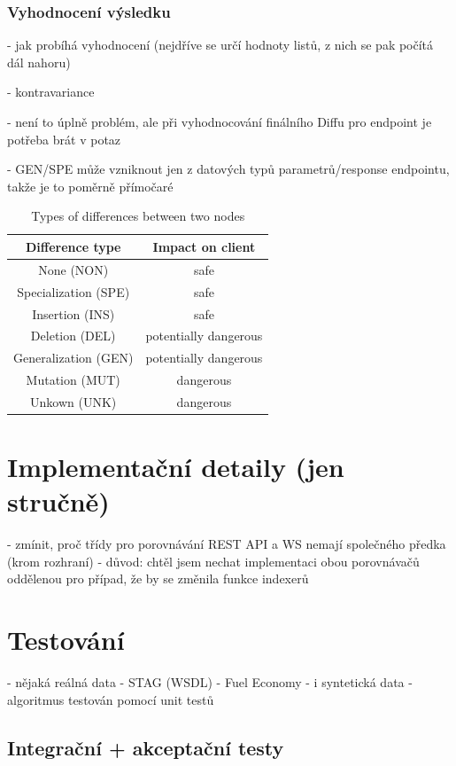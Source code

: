 \documentclass[czech,DP]{thesiskiv}
\begin{document}
\subsection{Vyhodnocení výsledku}

- jak probíhá vyhodnocení (nejdříve se určí hodnoty listů, z nich se pak počítá dál nahoru)

- kontravariance

	- není to úplně problém, ale při vyhodnocování finálního Diffu pro endpoint je potřeba brát v potaz 
	
	- GEN/SPE může vzniknout jen z datových typů parametrů/response endpointu, takže je to poměrně přímočaré

\begin{table}[h!]
	\centering
	\begin{tabular}{c|c}
		Difference type & Impact on client  \\
		\hline
		None (NON) & safe \\
		Specialization (SPE) & safe  \\
		Insertion (INS) & safe \\
		Deletion (DEL) & potentially dangerous \\
		Generalization (GEN) & potentially dangerous \\
		Mutation (MUT) & dangerous \\
		Unkown (UNK) & dangerous
	\end{tabular}
	\caption{Types of differences between two nodes }
	\label{tab:diff-level}
\end{table}

\chapter{Implementační detaily (jen stručně)}

 - zmínit, proč třídy pro porovnávání REST API a WS nemají společného předka (krom rozhraní)
 	- důvod: chtěl jsem nechat implementaci obou porovnávačů oddělenou pro případ, že by se změnila funkce indexerů

\chapter{Testování}

- nějaká reálná data
	- STAG (WSDL)
	- Fuel Economy
- i syntetická data
- algoritmus testován pomocí unit testů

\section{Integrační + akceptační testy}
\end{document}
